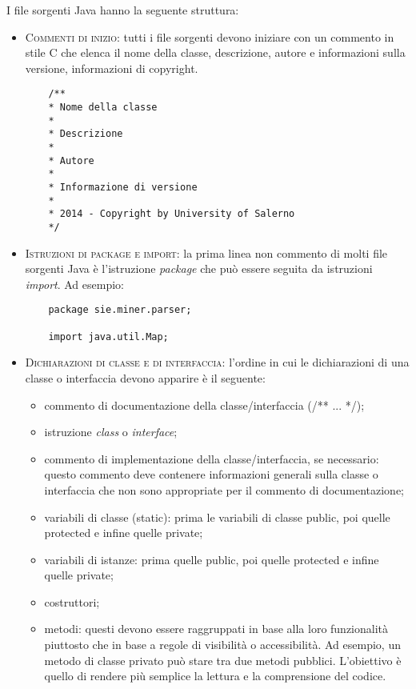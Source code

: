I file sorgenti Java hanno la seguente struttura:
\begin{itemize}
  \item \textsc{Commenti di inizio:} tutti i file sorgenti devono iniziare con un commento in stile C che elenca il nome della classe, descrizione, autore e informazioni sulla versione, informazioni di copyright.
\clearpage
  \begin{lstlisting}
    /**
    * Nome della classe
    * 
    * Descrizione
    *
    * Autore
    *
    * Informazione di versione
    *
    * 2014 - Copyright by University of Salerno
    */
  \end{lstlisting}
  
  \item \textsc{Istruzioni di package e import:} la prima linea non commento di molti file sorgenti Java è l'istruzione \textit{package} che può essere seguita da istruzioni \textit{import}. Ad esempio:\\
  \begin{lstlisting}
    package sie.miner.parser;
    
    import java.util.Map;
  \end{lstlisting}

  \item \textsc{Dichiarazioni di classe e di interfaccia:} l'ordine in cui le dichiarazioni di una classe o interfaccia devono apparire è il seguente: 
\begin{itemize}
  \item commento di documentazione della classe/interfaccia (/** ... */);
  \item istruzione \textit{class} o \textit{interface};
  \item commento di implementazione della classe/interfaccia, se necessario: questo commento deve contenere informazioni generali sulla classe o interfaccia che non sono appropriate per il commento di documentazione;
  \item variabili di classe (static): prima le variabili di classe public, poi quelle protected e infine quelle private;
  \item variabili di istanze: prima quelle public, poi quelle protected e infine quelle private;
  \item costruttori;
  \item metodi: questi devono essere raggruppati in base alla loro funzionalità piuttosto che in base a regole di visibilità o accessibilità. Ad esempio, un metodo di classe privato può stare tra due metodi pubblici. L'obiettivo è quello di rendere più semplice la lettura e la comprensione del codice.
\end{itemize}  

\end{itemize}

